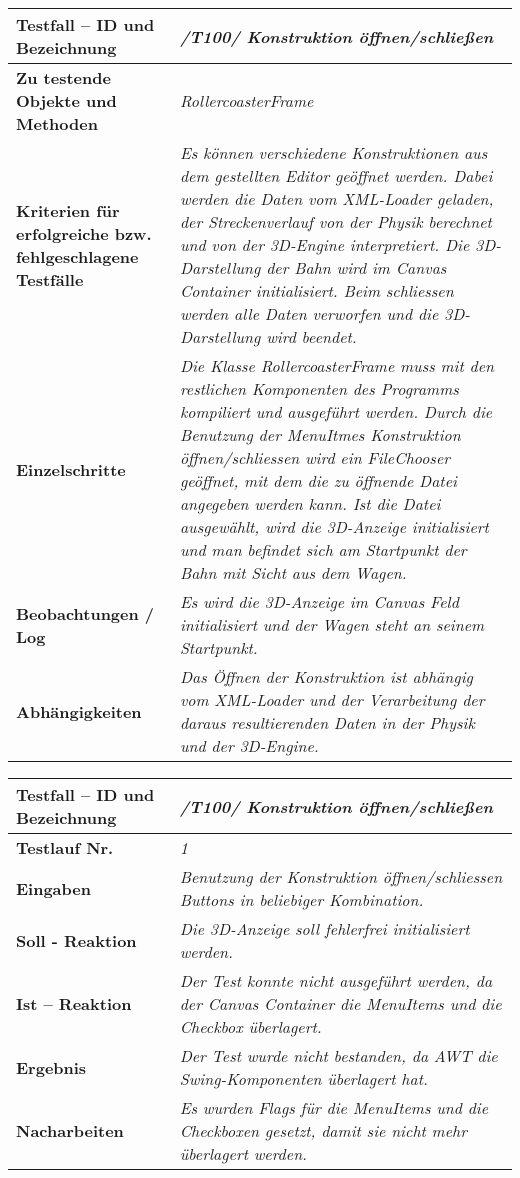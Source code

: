 \begin{longtable}{|p{7cm}|p{10cm}|}
\hline
\textbf{Testfall -- ID und Bezeichnung} &  \textit{/T100/ Konstruktion öffnen/schließen } \\
\hline
\textbf{Zu testende Objekte und Methoden} &  \textit{RollercoasterFrame}
\\
\hline
\textbf{Kriterien für erfolgreiche bzw. fehlgeschlagene Testfälle} &
\textit{Es können verschiedene Konstruktionen aus dem gestellten Editor geöffnet werden. Dabei werden die Daten vom XML-Loader geladen, der Streckenverlauf von der Physik berechnet
 und von der 3D-Engine interpretiert. Die 3D-Darstellung der Bahn wird im Canvas Container initialisiert. Beim schliessen werden alle Daten verworfen und die 3D-Darstellung wird beendet.} \\
\hline
\textbf{Einzelschritte} &  \textit{Die Klasse RollercoasterFrame muss mit den restlichen Komponenten des Programms kompiliert und ausgeführt werden. Durch die Benutzung der MenuItmes
Konstruktion öffnen/schliessen wird ein FileChooser geöffnet, mit dem die zu öffnende Datei angegeben werden kann. Ist die Datei ausgewählt, wird die 3D-Anzeige initialisiert und man befindet
sich am Startpunkt der Bahn mit Sicht aus dem Wagen.} \\
\hline
\textbf{Beobachtungen / Log} &  \textit{Es wird die 3D-Anzeige im Canvas Feld initialisiert und der Wagen steht an seinem Startpunkt.} \\
\hline
\textbf{Abhängigkeiten} &  \textit{Das Öffnen der Konstruktion ist abhängig vom XML-Loader und der Verarbeitung der daraus resultierenden Daten in der Physik und der 3D-Engine.} \\
\hline
 \end{longtable}


\begin{longtable}{|p{7cm}|p{10cm}|}
\hline
\textbf{Testfall -- ID und Bezeichnung} & \textit{/T100/ Konstruktion öffnen/schließen} \\
\hline
\textbf{Testlauf Nr.} & \textit{1} \\
\hline
\textbf{Eingaben} & \textit{Benutzung der Konstruktion öffnen/schliessen Buttons in beliebiger Kombination.} \\
\hline
\textbf{Soll - Reaktion} & \textit{ Die 3D-Anzeige soll fehlerfrei initialisiert werden.} \\
\hline
\textbf{Ist -- Reaktion} & \textit{ Der Test konnte nicht ausgeführt werden, da der Canvas Container die MenuItems und die Checkbox überlagert.} \\
\hline
\textbf{Ergebnis} & \textit{Der Test wurde nicht bestanden, da AWT die Swing-Komponenten überlagert hat.} \\
\hline
\textbf{Nacharbeiten } & \textit{Es wurden Flags für die MenuItems und die Checkboxen gesetzt, damit sie nicht mehr überlagert werden.} \\
\hline
 \end{longtable}

